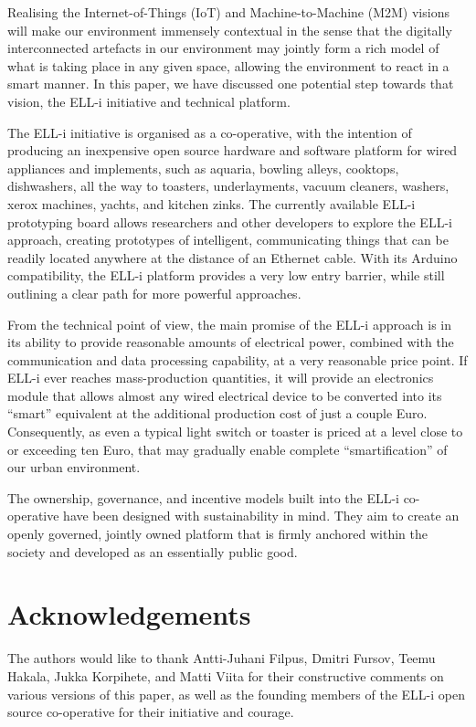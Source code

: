 \documentclass[final]{siamltex}
\begin{document}
Realising the Internet-of-Things (IoT) and Machine-to-Machi\-ne (M2M)
visions will make our environment immensely contextual in the sense
that the digitally interconnected artefacts in our environment may
jointly form a rich model of what is taking place in any given space,
allowing the environment to react in a smart manner.  In this paper,
we have discussed one potential step towards that vision, the ELL-i
initiative and technical platform.

The ELL-i initiative is organised as a co-operative, with the
intention of producing an inexpensive open source hardware and software
platform for wired appliances and implements, such as aquaria, bowling
alleys, cooktops, dishwashers, all the way to toasters, underlayments,
vacuum cleaners, washers, xerox machines, yachts, and kitchen zinks.
The currently available ELL-i prototyping board allows researchers and
other developers to explore the ELL-i approach, creating prototypes of
intelligent, communicating things that can be readily located anywhere
at the distance of an Ethernet cable.  With its Arduino compatibility,
the ELL-i platform provides a very low entry barrier, while still
outlining a clear path for more powerful approaches.

From the technical point of view, the main promise of the ELL-i
approach is in its ability to provide reasonable amounts of electrical
power, combined with the communication and data processing capability,
at a very reasonable price point.  If ELL-i ever reaches
mass-production quantities, it will provide an electronics module that
allows almost any wired electrical device to be converted into its
``smart'' equivalent at the additional production cost of just a
couple Euro.  Consequently, as even a typical light switch or toaster
is priced at a level close to or exceeding ten Euro, that may
gradually enable complete ``smartification'' of our urban
environment. 

The ownership, governance, and incentive models built into the ELL-i
co-operative have been designed with sustainability in mind.  They aim
to create an openly governed, jointly owned platform that is firmly
anchored within the society and developed as an essentially public good.

\section*{Acknowledgements}

The authors would like to thank Antti-Juhani Filpus, Dmitri Fursov,
Teemu Hakala, Jukka Korpihete, and Matti Viita for their constructive
comments on various versions of this paper, as well as the founding
members of the ELL-i open source co-operative for their initiative and
courage.

{}

\end{document}
